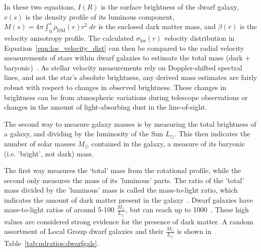 In these two equations, $I(R)$ is the surface brightness of the dwarf galaxy, $v(s)$ is the density profile of its luminous component, $M(s)=4\pi \int_0^s \rho_{\textrm{DM}}(r) r^2 \; dr$ is the enclosed dark matter mass, and $\beta(r)$ is the velocity anisotropy profile.
The calculated $\sigma_{\mathrm{los}}(r)$ velocity distribution in Equation~\ref{eqn:los_velocity_dist} can then be compared to the radial velocity measurements of stars within dwarf galaxies to estimate the total mass (dark + baryonic)~\cite{dwarf_gal_vel_dispersion,dwarf_gal_vel_dispersion_a,dwarf_jfactors_no_priors}.
As stellar velocity measurements rely on Doppler-shifted spectral lines, and not the star's absolute brightness, any derived mass estimates are fairly robust with respect to changes in observed brightness.
These changes in brightness can be from atmospheric variations during telescope observations or changes in the amount of light-absorbing dust in the line-of-sight.

The second way to measure galaxy masses is by measuring the total brightness of a galaxy, and dividing by the luminosity of the Sun $L_\odot$.
This then indicates the number of solar masses $M_\odot$ contained in the galaxy, a measure of its baryonic (i.e. 'bright', not dark) mass.
    
The first way measures the `total' mass from the rotational profile, while the second only measures the mass of its 'luminous' parts.
The ratio of the 'total' mass divided by the 'luminous' mass is called the mass-to-light ratio, which indicates the amount of dark matter present in the galaxy~\cite{faber_ml}.
Dwarf galaxies have mass-to-light ratios of around 5-100 $\frac{M_\odot}{L_\odot}$, but can reach up to \nicetilde \SI{1000}{}~\cite{Simon2007_dwarfgalaxykeck}.
These high values are considered strong evidence for the presence of dark matter.
A random assortment of Local Group dwarf galaxies and their $\frac{M_\odot}{L_\odot}$ is shown in Table~\ref{tab:mlratios:dwarfgals}.
    
